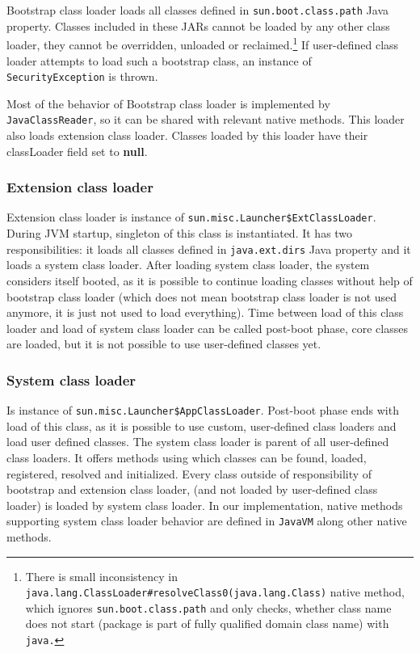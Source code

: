 \documentclass[11pt,twoside,a4paper]{book}
\begin{document}
Bootstrap class loader loads all classes defined in \texttt{sun.boot.class.path} Java property.\cite{sun.boot.class.path}
Classes included in these JARs cannot be loaded by any other class loader, they cannot be overridden, unloaded or reclaimed.\footnote{There is small inconsistency in \texttt{java.lang.ClassLoader\#resolveClass0(java.lang.Class)} native method, which ignores \texttt{sun.boot.class.path} and only checks, whether class name does not start (package is part of fully qualified domain class name) with \texttt{java.}}
If user-defined class loader attempts to load such a bootstrap class, an instance of \texttt{SecurityException} is thrown.

Most of the behavior of Bootstrap class loader is implemented by \texttt{JavaClassReader}, so it can be shared with relevant native methods. 
This loader also loads extension class loader. 
Classes loaded by this loader have their classLoader field set to \textbf{null}.


\subsubsection{Extension class loader}

Extension class loader is instance of \texttt{sun.misc.Launcher\$ExtClassLoader}.
During JVM startup, singleton of this class is instantiated. 
It has two responsibilities:
it loads all classes defined in \texttt{java.ext.dirs} Java property and it loads a system class loader. 
After loading system class loader, the system considers itself booted, as it is possible to continue loading classes without help of bootstrap class loader (which does not mean bootstrap class loader is not used anymore, it is just not used to load everything). 
Time between load of this class loader and load of system class loader can be called post-boot phase, core classes are loaded, but it is not possible to use user-defined classes yet.

\subsubsection{System class loader}

Is instance of \texttt{sun.misc.Launcher\$AppClassLoader}. 
Post-boot phase ends with load of this class, as it is possible to use custom, user-defined class loaders and load user defined classes.
The system class loader is parent of all user-defined class loaders.
It offers methods using which classes can be found, loaded, registered, resolved and initialized.
Every class outside of responsibility of bootstrap and extension class loader, (and not loaded by user-defined class loader) is loaded by system class loader. 
In our implementation, native methods supporting system class loader behavior are defined in \texttt{JavaVM} along other native methods.
\end{document}
